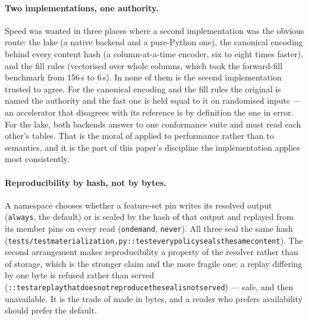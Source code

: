 \documentclass[11pt,a4paper]{article}
\renewcommand{\_}{\oldunderscore\allowbreak}
\theoremstyle{plain}
\theoremstyle{definition}
\theoremstyle{definition}
\theoremstyle{remark}
\begin{document}
\paragraph{Two implementations, one authority.} Speed was wanted in three places where a second
implementation was the obvious route: the lake (a native backend and a pure-Python one), the canonical
encoding behind every content hash (a column-at-a-time encoder, six to eight times faster), and the fill
rules (vectorised over whole columns, which took the forward-fill benchmark from 156\,s to 6\,s). In none
of them is the second implementation trusted to agree. For the canonical encoding and the fill rules the
original is named the authority and the fast one is held equal to it on randomised inputs --- an
accelerator that disagrees with its reference is by definition the one in error. For the lake, both
backends answer to one conformance suite and must read each other's tables. That is the moral of
 applied to performance rather than to semantics, and it is the part of this paper's
discipline the implementation applies most consistently.

\paragraph{Reproducibility by hash, not by bytes.} A namespace chooses whether a feature-set pin writes
its resolved output (\texttt{always}, the default) or is sealed by the hash of that output and replayed
from its member pins on every read (\texttt{on\_demand}, \texttt{never}). All three seal the same hash
(\texttt{tests/test\_materialization.py::test\_every\_policy\_seals\_the\_same\_content}). The second
arrangement makes reproducibility a property of the resolver rather than of storage, which is the
stronger claim and the more fragile one: a replay differing by one byte is refused rather than served
(\texttt{::test\_a\_replay\_that\_does\_not\_reproduce\_the\_seal\_is\_not\_served}) --- safe, and then
unavailable. It is the trade of  made in bytes, and a reader who prefers availability
should prefer the default.
\end{document}
